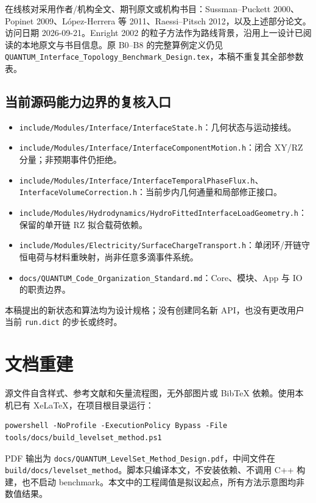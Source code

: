 \documentclass[11pt,a4paper]{article}
\newcommand{\code}[1]{{\small\nolinkurl{#1}}}
\begin{document}
在线核对采用作者/机构全文、期刊原文或机构书目：Sussman--Puckett 2000、Popinet 2009、López-Herrera 等 2011、Raessi--Pitsch 2012，以及上述部分论文。访问日期 2026-09-21。Enright 2002 的粒子方法作为路线背景，沿用上一设计已阅读的本地原文与书目信息。原 B0--B8 的完整算例定义仍见 \code{QUANTUM_Interface_Topology_Benchmark_Design.tex}，本稿不重复其全部参数表。

\clearpage
\subsection{当前源码能力边界的复核入口}
\begin{itemize}
\item \code{include/Modules/Interface/InterfaceState.h}：几何状态与运动接线。
\item \code{include/Modules/Interface/InterfaceComponentMotion.h}：闭合 XY/RZ 分量；非预期事件仍拒绝。
\item \code{include/Modules/Interface/InterfaceTemporalPhaseFlux.h}、\code{InterfaceVolumeCorrection.h}：当前步内几何通量和局部修正接口。
\item \code{include/Modules/Hydrodynamics/HydroFittedInterfaceLoadGeometry.h}：保留的单开链 RZ 拟合载荷依赖。
\item \code{include/Modules/Electricity/SurfaceChargeTransport.h}：单闭环/开链守恒电荷与材料重映射，尚非任意多滴事件系统。
\item \code{docs/QUANTUM_Code_Organization_Standard.md}：Core、模块、App 与 IO 的职责边界。
\end{itemize}
本稿提出的新状态和算法均为设计规格；没有创建同名新 API，也没有更改用户当前 \code{run.dict} 的步长或终时。

\section{文档重建}
源文件自含样式、参考文献和矢量流程图，无外部图片或 BibTeX 依赖。使用本机已有 XeLaTeX，在项目根目录运行：
\begin{lstlisting}
powershell -NoProfile -ExecutionPolicy Bypass -File tools/docs/build_levelset_method.ps1
\end{lstlisting}
PDF 输出为 \code{docs/QUANTUM_LevelSet_Method_Design.pdf}，中间文件在 \code{build/docs/levelset_method}。脚本只编译本文，不安装依赖、不调用 C++ 构建，也不启动 benchmark。本文中的工程阈值是拟议起点，所有方法示意图均非数值结果。
\end{document}
